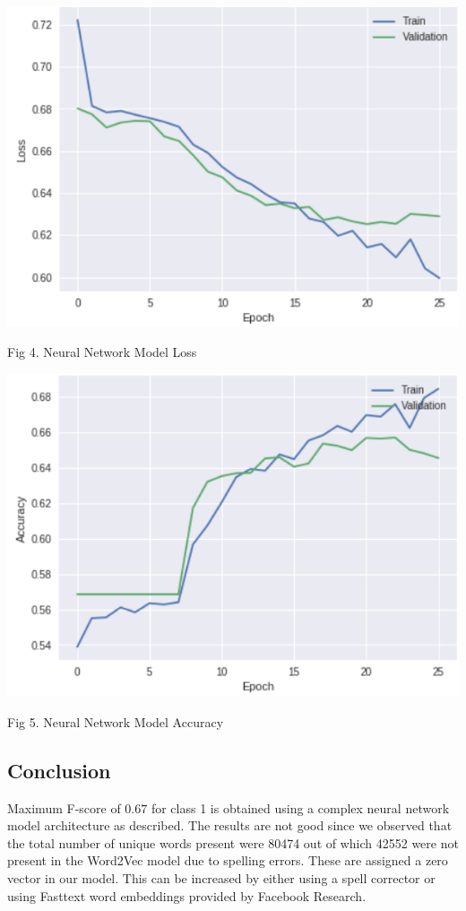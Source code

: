 \documentclass[12pt,journal,compsoc]{IEEEtran}
\begin{document}
\begin{center}
\includegraphics[scale=0.4]{Amazon_loss.PNG}

{\small Fig 4. Neural Network Model Loss}
\end{center}

\begin{center}
\includegraphics[scale=0.4]{Amazon_accuracy.PNG}

{\small Fig 5. Neural Network Model Accuracy}
\end{center}

\subsection{Conclusion}
\noindent Maximum F-score of $0.67$ for class 1 is obtained using a complex neural network model architecture as described. The results are not good since we observed that the total number of unique words present were 80474 out of which 42552 were not present in the Word2Vec model due to spelling errors. These are assigned a zero vector in our model. This can be increased by either using a spell corrector or using Fasttext word embeddings provided by Facebook Research.
\end{document}
